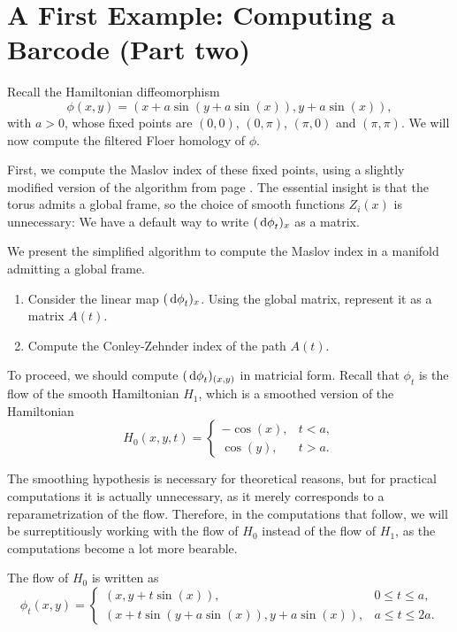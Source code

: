 \section{A First Example: Computing a Barcode (Part two)}

Recall the Hamiltonian diffeomorphism
\begin{equation}
\phi(x,y) = ( x + a \sin(y + a \sin(x)), y + a \sin(x)),
\end{equation}
with $a > 0$, whose fixed points are $(0,0)$, $(0,\pi)$, $(\pi, 0)$ and $(\pi,\pi)$. We will now compute the filtered Floer homology of $\phi$.

First, we compute the Maslov index of these fixed points, using a slightly modified version of the algorithm from page \pageref{page:maslovalg}. The essential insight is that the torus admits a global frame, so the choice of smooth functions $Z_i(x)$ is unnecessary: We have a default way to write $(\dl \phi_t)_x$ as a matrix.

We present the simplified algorithm to compute the Maslov index in a manifold admitting a global frame.
\begin{enumerate}[algorithm]\label{page:maslovalg2}
\item Consider the linear map $(\dl \phi_t)_x$. Using the global matrix, represent it as a matrix $A(t)$.
\item Compute the Conley-Zehnder index of the path $A(t)$.
\end{enumerate}

To proceed, we should compute $(\dl \phi_t)_{(x,y)}$ in matricial form. Recall that $\phi_t$ is the flow of the smooth Hamiltonian $H_1$, which is a smoothed version of the Hamiltonian
\begin{equation}
H_0(x,y,t) = \begin{cases}
-\cos(x), & t < a,\\
\cos(y), & t > a.
\end{cases}
\end{equation}

The smoothing hypothesis is necessary for theoretical reasons, but for practical computations it is actually unnecessary, as it merely corresponds to a reparametrization of the flow. Therefore, in the computations that follow, we will be surreptitiously working with the flow of $H_0$ instead of the flow of $H_1$, as the computations become a lot more bearable.

The flow of $H_0$ is written as
\begin{equation}
\phi_t(x,y) = \begin{cases}
(x,y+t \sin(x)), & 0 \leq t \leq a,\\
(x+t \sin(y+a \sin(x)), y + a \sin(x)), & a \leq t \leq 2a.
\end{cases}
\end{equation}

